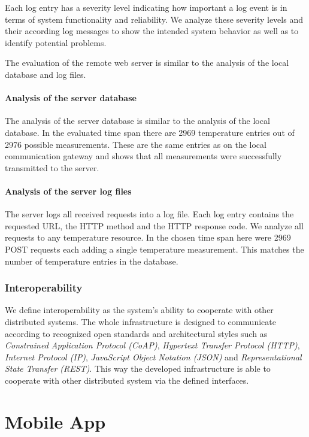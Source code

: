 Each log entry has a severity level indicating how important a log event is in terms of system functionality and reliability.
We analyze these severity levels and their according log messages to show the intended system behavior as well as to identify potential problems.





The evaluation of the remote web server is similar to the analysis of the local database and log files.

\paragraph{Analysis of the server database}


The analysis of the server database is similar to the analysis of the local database.
In the evaluated time span there are 2969 temperature entries out of 2976 possible measurements.
These are the same entries as on the local communication gateway and shows that all measurements were successfully transmitted to the server.

\paragraph{Analysis of the server log files}

The server logs all received requests into a log file.
Each log entry contains the requested URL, the HTTP method and the HTTP response code.
We analyze all requests to any temperature resource.
In the chosen time span here were 2969 POST requests each adding a single temperature measurement.
This matches the number of temperature entries in the database.






\subsubsection{Interoperability}

We define interoperability as the system's ability to cooperate with other distributed systems.
The whole infrastructure is designed to communicate according to recognized open standards and architectural styles such as \emph{Constrained Application Protocol (CoAP)}, \emph{Hypertext Transfer Protocol (HTTP)}, \emph{Internet Protocol (IP)}, \emph{JavaScript Object Notation (JSON)} and \emph{Representational State Transfer (REST)}.
This way the developed infrastructure is able to cooperate with other distributed system via the defined interfaces.










\section{Mobile App}
